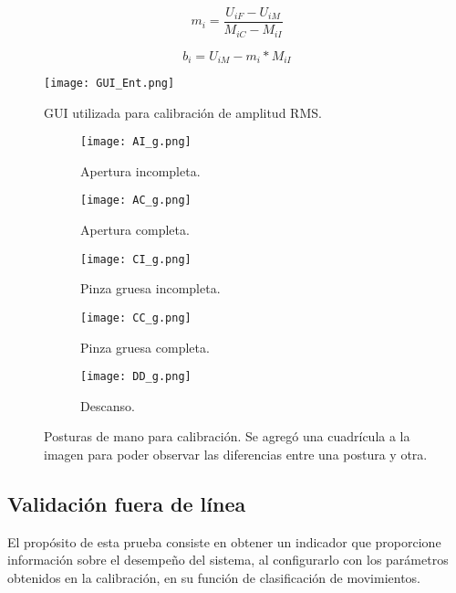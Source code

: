 \begin{equation}
	m_{i} = \frac{ U_{iF} - U_{iM} }{ M_{iC} - M_{iI} }
	\label{Ecu: m}
\end{equation}

\begin{equation}
	b_{i} = U_{iM} - m_{i}*M_{iI}
	\label{Ecu: b}
\end{equation}

\begin{figure}[htb]
	\centering
	\texttt{[image: GUI\_Ent.png]}
	\caption{GUI utilizada para calibración de amplitud RMS.}
	\label{Figura: GUI_Ent}
\end{figure}

\begin{figure}[htbp]
	\centering
	\begin{subfigure}[htbp]{0.4\textwidth}
		\texttt{[image: AI\_g.png]}
		\caption{Apertura incompleta.}
		\label{Figura: AI}
	\end{subfigure}
	\begin{subfigure}[htbp]{0.4\textwidth}
		\texttt{[image: AC\_g.png]}
		\caption{Apertura completa.}
		\label{Figura: AC}
	\end{subfigure}
	\newline
	\begin{subfigure}[htbp]{0.4\textwidth}
		\texttt{[image: CI\_g.png]}
		\caption{Pinza gruesa incompleta.}
		\label{Figura: CI}
	\end{subfigure}
	\begin{subfigure}[htbp]{0.4\textwidth}
		\texttt{[image: CC\_g.png]}
		\caption{Pinza gruesa completa.}
		\label{Figura: CC}
	\end{subfigure}
	\newline
	\begin{subfigure}[htbp]{0.4\textwidth}
		\texttt{[image: DD\_g.png]}
		\caption{Descanso.}
		\label{Figura: DD}
	\end{subfigure}
	\caption[Posturas de mano para calibración]{Posturas de mano para calibración. Se agregó una cuadrícula a la imagen para poder observar las diferencias entre una postura y otra.}
	\label{Figura: Posturas}
\end{figure}

\subsection{Validación fuera de línea}
El propósito de esta prueba consiste en obtener un indicador que proporcione información sobre el desempeño del sistema, al configurarlo con los parámetros obtenidos en la calibración, en su función de clasificación de movimientos.

